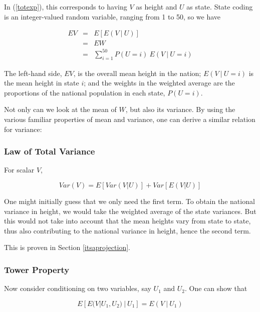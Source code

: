 In (\ref{totexp}), this corresponds to having $V$ as height and $U$ as
state.  State coding is an integer-valued random variable, ranging 
from 1 to 50, so we have

\begin{eqnarray}
EV &=& E[E(V ~|~ U)] \\
&=& EW \\
&=& \sum_{i=1}^{50} P(U = i) ~ E(V ~|~ U = i)
\end{eqnarray}

The left-hand side, $EV$, is the overall mean height in the nation;
$E(V ~|~ U = i)$ is the mean height in state $i$; and the weights in the
weighted average are the proportions of the national population in each
state, $P(U = i)$.

% 

Not only can we look at the mean of $W$, but also its variance.  By
using the various familiar properties of mean and variance, one can
derive a similar relation for variance: 

\subsubsection{Law of Total Variance}

For scalar $V$,

\begin{equation}
\label{totvar}
Var(V) = E[Var(V|U)] + Var[E(V|U)]
\end{equation}

One might initially guess that we only need the first term.  To obtain
the national variance in height, we would take the weighted average of
the state variances.  But this would not take into account that the mean
heights vary from state to state, thus also contributing to the national
variance in height, hence the second term.

This is proven in Section \ref{itsaprojection}.

\subsubsection{Tower Property}
\label{tower}

Now consider conditioning on two variables, say $U_1$ and $U_2$.  One
can show that

\begin{equation}
E 
\left [
E(V | U_1, U_2) ~|~ U_1
\right ]
= E(V ~|~ U_1)
\end{equation}

